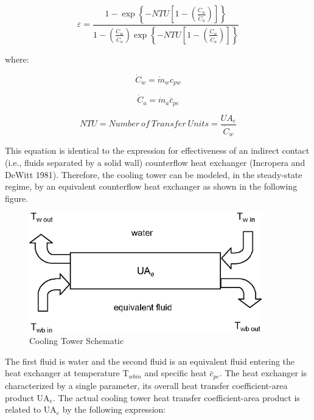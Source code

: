 \begin{equation}
\varepsilon = \frac{{1 - \exp \left\{ { - NTU\left[ {1 - \left( {\frac{{{{\dot C}_w}}}{{{{\dot C}_a}}}} \right)} \right]} \right\}}}{{1 - \left( {\frac{{{{\dot C}_w}}}{{{{\dot C}_a}}}} \right)\exp \left\{ { - NTU\left[ {1 - \left( {\frac{{{{\dot C}_w}}}{{{{\dot C}_a}}}} \right)} \right]} \right\}}}
\end{equation}

where:

\begin{equation}
{\dot C_w} = {\dot m_w}c_{pw}
\end{equation}

\begin{equation}
{\dot C_a} = {\dot m_a}\bar c_{pe}
\end{equation}

\begin{equation}
NTU = Number~of~Transfer~Units = \frac{{UA_e}}{{{{\dot C}_w}}}
\end{equation}

This equation is identical to the expression for effectiveness of an indirect contact (i.e., fluids separated by a solid wall) counterflow heat exchanger (Incropera and DeWitt 1981). Therefore, the cooling tower can be modeled, in the steady-state regime, by an equivalent counterflow heat exchanger as shown in the following figure.

\begin{figure}[hbtp] %
\centering
\includegraphics[width=0.9\textwidth, height=0.9\textheight, keepaspectratio=true]{media/image4542.png}
\caption{Cooling Tower Schematic \protect \label{fig:cooling-tower-schematic}}
\end{figure}

The first fluid is water and the second fluid is an equivalent fluid entering the heat exchanger at temperature T\(_{wbin}\) and specific heat \(\bar c_{pe}\). The heat exchanger is characterized by a single parameter, its overall heat transfer coefficient-area product UA\(_{e}\). The actual cooling tower heat transfer coefficient-area product is related to UA\(_{e}\) by the following expression:


